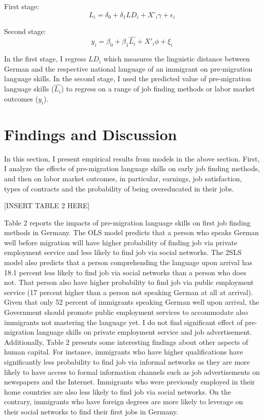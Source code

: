 \documentclass[12pt,a4paper]{article}
\begin{document}
First stage:
$$L_{i}=\delta_{0}+\delta_{1}LD_{i}+X'_{i}\gamma+\epsilon_{i}$$

Second stage:
$$y_{i}=\beta_{0}+\beta_{1}\hat{L_{i}}+X'_{i}\phi+\xi_{i}$$

In the first stage, I regress $LD_{i}$ which measures the linguistic distance between German and the respective national language of an immigrant on pre-migration language skills. In the second stage, I used the predicted value of pre-migration language skills ($\hat{L_{i}}$) to regress on a range of job finding methods or labor market outcomes ($y_{i}$).


\section{Findings and Discussion}
In this section, I present empirical results from models in the above section. First, I analyze the effects of pre-migration language skills on early job finding methods, and then on labor market outcomes, in particular, earnings, job satisfaction, types of contracts and the probability of being overeducated in their jobs.

\begin{center}
[INSERT TABLE 2 HERE]
\end{center}

Table 2 reports the impacts of pre-migration language skills on first job finding methods in Germany. The OLS model predicts that a person who speaks German well before migration will have higher probability of finding job via private employment service and less likely to find job via social networks. The 2SLS model also predicts that a person comprehending the language upon arrival has 18.1 percent less likely to find job via social networks than a person who does not. That person also have higher probability to find job via public employment service (17 percent higher than a person not speaking German at all at arrival). Given that only 52 percent of immigrants speaking German well upon arrival, the Government should promote public employment services to accommodate also immigrants not mastering the language yet. I do not find significant effect of pre-migration language skills on private employment service and job advertisement. Additionally, Table 2 presents some interesting findings about other aspects of human capital. For instance, immigrants who have higher qualifications have significantly less probability to find job via informal networks as they are more likely to have access to formal information channels such as job advertisements on newspapers and the Internet. Immigrants who were previously employed in their home countries are also less likely to find job via social networks. On the contrary, immigrants who have foreign degrees are more likely to leverage on their social networks to find their first jobs in Germany.
\end{document}
